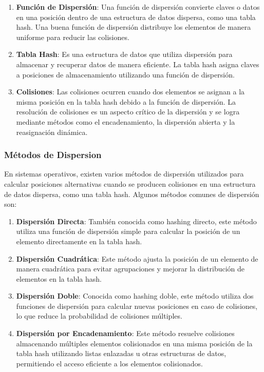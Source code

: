 \documentclass[12pt, a4paper]{article} %
\begin{document}
\begin{enumerate}
	\item \textbf{Función de Dispersión}: Una función de dispersión convierte claves o datos en una posición dentro de una estructura de datos dispersa, como una tabla hash. Una buena función de dispersión distribuye los elementos de manera uniforme para reducir las colisiones.
	\item \textbf{Tabla Hash}: Es una estructura de datos que utiliza dispersión para almacenar y recuperar datos de manera eficiente. La tabla hash asigna claves a posiciones de almacenamiento utilizando una función de dispersión.
	\item \textbf{Colisiones}: Las colisiones ocurren cuando dos elementos se asignan a la misma posición en la tabla hash debido a la función de dispersión. La resolución de colisiones es un aspecto crítico de la dispersión y se logra mediante métodos como el encadenamiento, la dispersión abierta y la reasignación dinámica.
\end{enumerate}

\subsubsection{Métodos de Dispersion}

En sistemas operativos, existen varios métodos de dispersión utilizados para calcular posiciones alternativas cuando se producen colisiones en una estructura de datos dispersa, como una tabla hash. Algunos métodos comunes de dispersión son:

\begin{enumerate}
	\item \textbf{Dispersión Directa}: También conocida como hashing directo, este método utiliza una función de dispersión simple para calcular la posición de un elemento directamente en la tabla hash.
	\item \textbf{Dispersión Cuadrática}: Este método ajusta la posición de un elemento de manera cuadrática para evitar agrupaciones y mejorar la distribución de elementos en la tabla hash.
	\item \textbf{Dispersión Doble}: Conocida como hashing doble, este método utiliza dos funciones de dispersión para calcular nuevas posiciones en caso de colisiones, lo que reduce la probabilidad de colisiones múltiples.
	\item \textbf{Dispersión por Encadenamiento}: Este método resuelve colisiones almacenando múltiples elementos colisionados en una misma posición de la tabla hash utilizando listas enlazadas u otras estructuras de datos, permitiendo el acceso eficiente a los elementos colisionados.
\end{enumerate}
\end{document}
